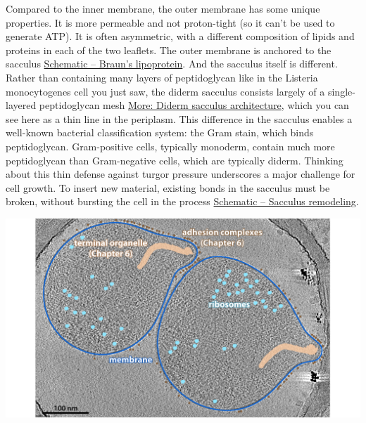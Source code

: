 \documentclass[]{tufte-book}
\begin{document}
Compared to the inner membrane, the outer membrane has some unique
properties. It is more permeable and not proton-tight (so it can't be
used to generate ATP). It is often asymmetric, with a different
composition of lipids and proteins in each of the two leaflets. The
outer membrane is anchored to the sacculus
\protect\hyperlink{fig:2-3-1}{Schematic -- Braun's lipoprotein}. And the
sacculus itself is different. Rather than containing many layers of
peptidoglycan like in the Listeria monocytogenes cell you just saw, the
diderm sacculus consists largely of a single-layered peptidoglycan mesh
\protect\hyperlink{Diderm_sacculus_architecture}{More: Diderm sacculus
architecture}, which you can see here as a thin line in the periplasm.
This difference in the sacculus enables a well-known bacterial
classification system: the Gram stain, which binds peptidoglycan.
Gram-positive cells, typically monoderm, contain much more peptidoglycan
than Gram-negative cells, which are typically diderm. Thinking about
this thin defense against turgor pressure underscores a major challenge
for cell growth. To insert new material, existing bonds in the sacculus
must be broken, without bursting the cell in the process
\protect\hyperlink{fig:2-3-2}{Schematic -- Sacculus remodeling}.

\includegraphics{img/02_static/2_1_Mgenitalium}
\end{document}
